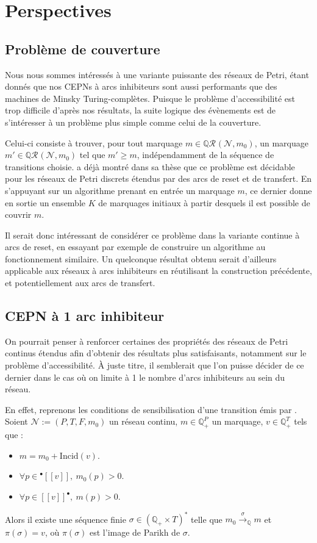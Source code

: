 \documentclass{article}
\theoremstyle{remark}
\theoremstyle{remark}
\newcommand{\preb}[1]{{}^\bullet #1}
\newcommand{\postb}[1]{#1^\bullet}
\newcommand{\reach}[3][]{\mathcal{R}^{#1}(\mathcal{#2}, #3)}
\newcommand{\creach}[3][]{\mathbb{Q}\reach[#1]{#2}{#3}}
\newcommand{\reaches}[1][]{\xrightarrow{#1}}
\newcommand{\creaches}[1][]{\reaches[#1]_{\mathbb{Q}}}
\newcommand{\incid}{\mathrm{Incid}}
\begin{document}
\newpage

\section{Perspectives}

\subsection{Problème de couverture}

Nous nous sommes intéressés à une variante puissante des réseaux de Petri, étant donnés que nos CEPNs à arcs inhibiteurs sont aussi performants que des machines de Minsky Turing-complètes. Puisque le problème d'accessibilité est trop difficile d'après nos résultats, la suite logique des évènements est de s'intéresser à un problème plus simple comme celui de la couverture.

Celui-ci consiste à trouver, pour tout marquage $m \in \creach{N}{m_0}$, un marquage $m' \in \creach{N}{m_0}$ tel que $m' \geq m$, indépendamment de la séquence de transitions choisie. \cite{dufourd} a déjà montré dans sa thèse que ce problème est décidable pour les réseaux de Petri discrets étendus par des arcs de reset et de transfert. En s'appuyant sur un algorithme prenant en entrée un marquage $m$, ce dernier donne en sortie un ensemble $K$ de marquages initiaux à partir desquels il est possible de couvrir $m$.

Il serait donc intéressant de considérer ce problème dans la variante continue à arcs de reset, en essayant par exemple de construire un algorithme au fonctionnement similaire. Un quelconque résultat obtenu serait d'ailleurs applicable aux réseaux à arcs inhibiteurs en réutilisant la construction précédente, et potentiellement aux arcs de transfert.

\subsection{CEPN à 1 arc inhibiteur}

On pourrait penser à renforcer certaines des propriétés des réseaux de Petri continus étendus afin d'obtenir des résultats plus satisfaisants, notamment sur le problème d'accessibilité. À juste titre, il semblerait que l'on puisse décider de ce dernier dans le cas où on limite à 1 le nombre d'arcs inhibiteurs au sein du réseau.

En effet, reprenons les conditions de sensibilisation d'une transition émis par \autocite[Lemme 13]{fracahaddad}. Soient $\mathcal{N} := (P, T, F, m_0)$ un réseau continu, $m \in \mathbb{Q}_+^P$ un marquage, $v \in \mathbb{Q}_+^T$ tels que : \begin{itemize}
    \item $m = m_0 + \incid(v)$.
    \item $\forall p \in \preb{[\![v]\!]},\ m_0(p) > 0$.
    \item $\forall p \in \postb{[\![v]\!]},\ m(p) > 0$.
\end{itemize}
Alors il existe une séquence finie $\sigma \in (\mathbb{Q}_+ \times T)^*$ telle que $m_0 \creaches[\sigma] m$ et $\pi(\sigma) = v$, où $\pi(\sigma)$ est l'image de Parikh de $\sigma$.
\end{document}
